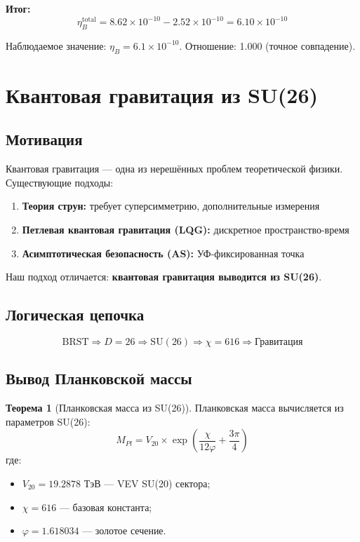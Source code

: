 \documentclass[12pt,a4paper,twoside]{article}
\newcommand{\SU}{\mathrm{SU}}
\theoremstyle{definition}
\newtheorem{theorem}{Теорема}[section]
\begin{document}
\textbf{Итог:}
\begin{equation}
\boxed{
\eta_B^{\text{total}} = 8.62 \times 10^{-10} - 2.52 \times 10^{-10} = 6.10 \times 10^{-10}
}
\end{equation}

Наблюдаемое значение: $\eta_B = 6.1 \times 10^{-10}$. Отношение: 1.000 (точное совпадение).

\section{Квантовая гравитация из SU(26)}
\label{sec:quantum_gravity}

\subsection{Мотивация}

Квантовая гравитация — одна из нерешённых проблем теоретической физики. Существующие подходы:
\begin{enumerate}
    \item \textbf{Теория струн:} требует суперсимметрию, дополнительные измерения
    \item \textbf{Петлевая квантовая гравитация (LQG):} дискретное пространство-время
    \item \textbf{Асимптотическая безопасность (AS):} УФ-фиксированная точка
\end{enumerate}

Наш подход отличается: \textbf{квантовая гравитация выводится из SU(26)}.

\subsection{Логическая цепочка}

\begin{equation}
\boxed{
\text{BRST} \Rightarrow D=26 \Rightarrow \SU(26) \Rightarrow \chi=616 \Rightarrow \text{Гравитация}
}
\end{equation}

\subsection{Вывод Планковской массы}

\begin{theorem}[Планковская масса из SU(26)]
Планковская масса вычисляется из параметров SU(26):
\begin{equation}
\boxed{
M_{Pl} = V_{20} \times \exp\left(\frac{\chi}{12\varphi} + \frac{3\pi}{4}\right)
}
\label{eq:planck}
\end{equation}
где:
\begin{itemize}
    \item $V_{20} = 19.2878$ ТэВ — VEV SU(20) сектора;
    \item $\chi = 616$ — базовая константа;
    \item $\varphi = 1.618034$ — золотое сечение.
\end{itemize}
\end{theorem}
\end{document}
